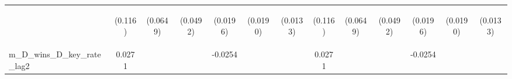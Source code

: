 \documentclass[]{article}
\begin{document}
\begin{center}
\begin{tabular}{lcccccccccccc}
\vspace{4pt} & \begin{footnotesize}(0.116)\end{footnotesize} & \begin{footnotesize}(0.0649)\end{footnotesize} & \begin{footnotesize}(0.0492)\end{footnotesize} & \begin{footnotesize}(0.0196)\end{footnotesize} & \begin{footnotesize}(0.0190)\end{footnotesize} & \begin{footnotesize}(0.0133)\end{footnotesize} & \begin{footnotesize}(0.116)\end{footnotesize} & \begin{footnotesize}(0.0649)\end{footnotesize} & \begin{footnotesize}(0.0492)\end{footnotesize} & \begin{footnotesize}(0.0196)\end{footnotesize} & \begin{footnotesize}(0.0190)\end{footnotesize} & \begin{footnotesize}(0.0133)\end{footnotesize} \\
m\_D\_wins\_D\_key\_rate\_lag2 & 0.0271 &  &  & -0.0254 &  &  & 0.0271 &  &  & -0.0254 &  &  \\

\end{tabular}
\end{center}
\end{document}
